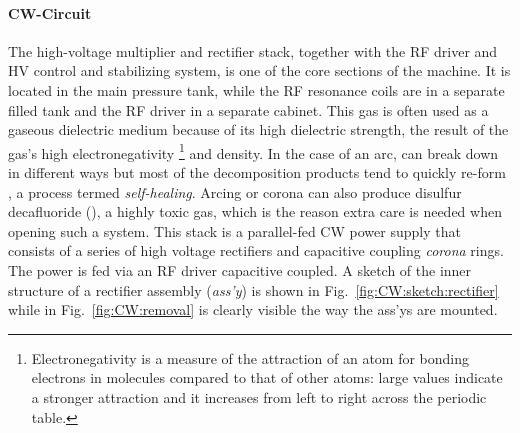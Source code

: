 \begin{refsection}
        \paragraph{CW-Circuit}
        The high-voltage multiplier and rectifier stack, together with the RF driver and HV control and stabilizing system, is one of the core sections of the machine.
        It is located in the main pressure tank, while the RF resonance coils are in a separate  filled tank and the RF driver in a separate cabinet.
        This gas is often used as a gaseous dielectric medium because of its high dielectric strength, the result of the gas's high electronegativity
        \footnote{Electronegativity is a measure of the attraction of an atom for bonding electrons in molecules compared to that of other atoms: large values indicate a stronger attraction and it increases from left to right across the periodic table.} and density.
        In the case of an arc,  can break down in different ways but most of the decomposition products tend to quickly re-form , a process termed \textit{self-healing}. 
        Arcing or corona can also produce disulfur decafluoride (), a highly toxic gas, which is the reason extra care is needed when opening such a system.
        This stack is a parallel-fed CW power supply that consists of a series of high voltage rectifiers and capacitive coupling \textit{corona} rings.
        The power is fed via an RF driver capacitive coupled.
        A sketch of the inner structure of a rectifier assembly (\textit{ass'y}) is shown in Fig.~\ref{fig:CW:sketch:rectifier} while in Fig.~\ref{fig:CW:removal} is clearly visible the way the ass'ys are mounted.


\end{refsection}
